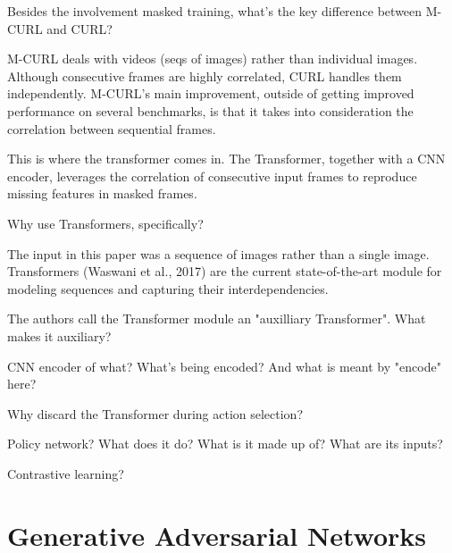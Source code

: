 \begin{quest}
	\item Besides the involvement masked training, what's the key difference between M-CURL and CURL?
	\begin{ans}
		M-CURL deals with videos (seqs of images) rather than individual images. Although consecutive frames are highly correlated, CURL handles them independently. M-CURL's main improvement, outside of getting improved performance on several benchmarks, is that it takes into consideration the correlation between sequential frames.  

		This is where the transformer comes in. The Transformer, together with a CNN encoder, leverages the correlation of consecutive input frames to reproduce missing features in masked frames.  
	\end{ans}
	
	\item Why use Transformers, specifically?
	\begin{ans}
		The input in this paper was a sequence of images rather than a single image. Transformers (Waswani et al., 2017) are the current state-of-the-art module for modeling sequences and capturing their interdependencies.  
	\end{ans}

	\item The authors call the Transformer module an "auxilliary Transformer". What makes it auxiliary? 

	\item CNN encoder of what? What's being encoded? And what is meant by "encode" here?
	\begin{ans}

	\end{ans}

	\item Why discard the Transformer during action selection?

	\item Policy network? What does it do? What is it made up of? What are its inputs?

	\item Contrastive learning?
\end{quest}


\chapter{Generative Adversarial Networks}



